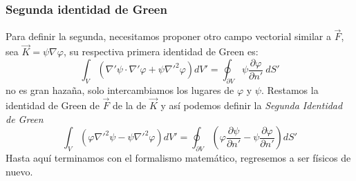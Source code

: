 \documentclass[11pt,a4paper]{article}
\begin{document}
\subsubsection{Segunda identidad de Green}

Para definir la segunda, necesitamos proponer otro campo vectorial similar a $\vec{F}$, sea $\vec{K}=\psi\nabla\varphi$, su respectiva primera identidad de Green es:
$$\int_V\left(\nabla'\psi\cdot\nabla'\varphi+\psi\nabla'^2\varphi\right)dV'=\oint_{\partial V}\psi\frac{\partial\varphi}{\partial n'}\  dS'$$
no es gran hazaña, solo intercambiamos los lugares de $\varphi$ y $\psi$. Restamos la identidad de Green de $\vec{F}$ de la de $\vec{K}$ y así podemos definir la \emph{Segunda Identidad de Green}
\begin{equation}\label{eq:segundaIdentidadGreen}
\int_V\left(\varphi\nabla'^2\psi-\psi\nabla'^2\varphi\right)dV'=\oint_{\partial V}\left(\varphi\frac{\partial\psi}{\partial n'}-\psi\frac{\partial\varphi}{\partial n'}\right)dS'
\end{equation}
Hasta aquí terminamos con el formalismo matemático, regresemos a ser físicos de nuevo.
\end{document}
